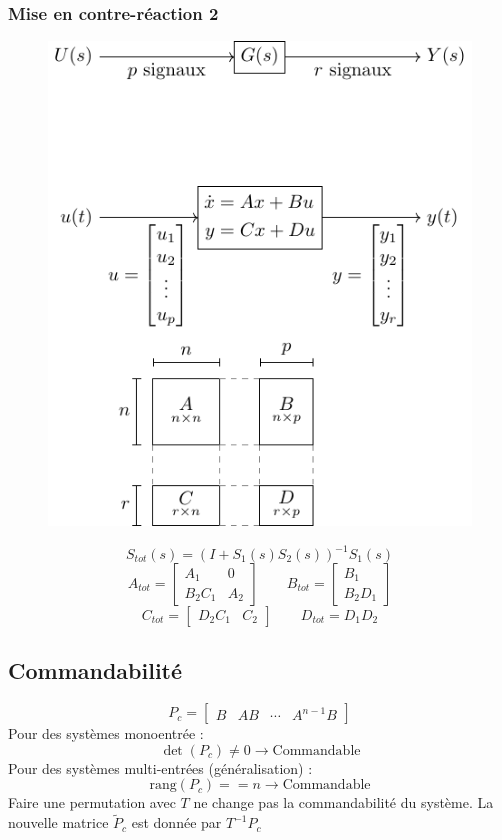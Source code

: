 \documentclass[resume]{subfiles}
\begin{document}
\subsubsection{Mise en contre-réaction 2}
\begin{figure}[H]
\centering
\includegraphics[scale=1,page=5]{drwg_0.pdf}
\end{figure}
$$S_{tot}(s)=\left(I+S_1(s)S_2(s)\right)^{-1}S_1(s)$$
$$A_{tot}=\begin{bmatrix}A_1 & 0\\B_2C_1 & A_2\end{bmatrix}\qquad B_{tot}=\begin{bmatrix}B_1\\B_2D_1\end{bmatrix}$$
$$C_{tot}=\begin{bmatrix}
D_2 C_1 & C_2
\end{bmatrix}\qquad D_{tot}=D_1D_2$$
\subsection{Commandabilité}
$$\boxed{P_c=\begin{bmatrix}B & AB & \cdots & A^{n-1}B\end{bmatrix}}$$
Pour des systèmes monoentrée :
$$\det(P_c)\neq 0\longrightarrow \text{Commandable}$$
Pour des systèmes multi-entrées (généralisation) :
$$\text{rang}(P_c)==n\longrightarrow \text{Commandable}$$
Faire une permutation avec $T$ ne change pas la commandabilité du système. La nouvelle matrice $\tilde{P}_c$ est donnée par $T^{-1}P_c$
\end{document}
